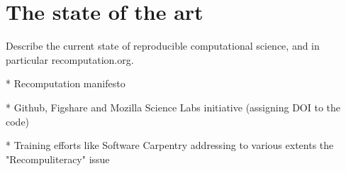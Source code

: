 \section{The state of the art}
\label{s:recomputation}

Describe the current state of reproducible computational science, and
in particular recomputation.org.
\cite{gent:recomputation}

* Recomputation manifesto

* Github, Figshare and Mozilla Science Labs initiative (assigning DOI to the code)

* Training efforts like Software Carpentry addressing to various extents the "Recompuliteracy" issue

